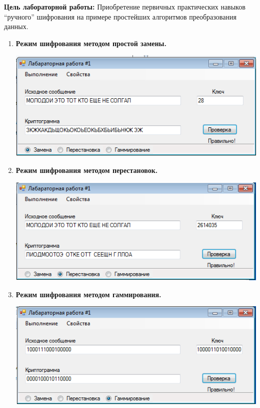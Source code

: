 \documentclass[a4paper,14pt]{extarticle}
\begin{document}
    \textbf{Цель лабораторной работы:}
    Приобретение первичных практических навыков “ручного” шифрования на примере простейших алгоритмов преобразования данных.

    \begin{enumerate}
        \item \textbf{Режим шифрования методом простой замены.}
        \begin{center}
            \includegraphics[scale=0.9]{pics/change.png}
        \end{center}
        \item \textbf{Режим шифрования методом перестановок.}
        \begin{center}
            \includegraphics[scale=0.9]{pics/reorder.png}
        \end{center}
        \newpage
        \item \textbf{Режим шифрования методом гаммирования.}
        \begin{center}
            \includegraphics[scale=0.9]{pics/gamm1.png}

\end{center}
\end{enumerate}
\end{document}
